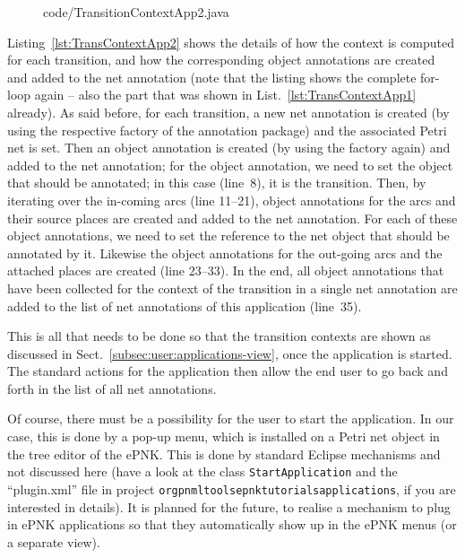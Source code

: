 \begin{figure}[htbp!]
%
  {code/TransitionContextApp2.java}
\end{figure}
%
Listing~\ref{lst:TransContextApp2} shows the details of how the context 
is computed for each transition, and how the corresponding object annotations
are created and added to the net annotation (note that the listing shows
the complete for-loop again -- also the part that was shown in
List.~\ref{lst:TransContextApp1} already). As said before, for each transition,
a new net annotation is created (by using the respective factory of the
annotation package) and the associated Petri net is set. Then an object
annotation is created (by using the factory again) and added to the net
annotation; for the object annotation, we need to set the object that should be
annotated; in this case (line~8), it is the transition. Then, by iterating over
the in-coming arcs (line 11--21), object annotations for the arcs and their
source places are created and added to the net annotation. For each of these
object annotations, we need to set the reference to the net object that should
be annotated by it. Likewise the object annotations for the out-going arcs
and the attached places are created (line 23--33).
In the end, all object annotations that have been collected for the context of
the transition in a single net annotation are added to the list of net
annotations of this application (line~35).

This is all that needs to be done so that the transition contexts are shown
as discussed in Sect.~\ref{subsec:user:applications-view}, once the
application is started. The standard actions for the application then allow the
end user to go back and forth in the list of all net annotations.

Of course, there must be a possibility for the user to start the application. In
our case, this is done by a pop-up menu, which is installed on a Petri net object in the tree
editor of the ePNK. This is done by standard Eclipse mechanisms and not discussed
here (have a look at the class {\tt StartApplication} and the ``plugin.xml'' file
in project
{\tt org\qnsep{}pnml\qnsep{}tools\qnsep{}epnk\qnsep{}tutorials\qnsep{}applications},
if you are interested in details). It is planned for the future, to realise a
mechanism to plug in ePNK applications so that they automatically show up in
the ePNK menus (or a separate view).%

